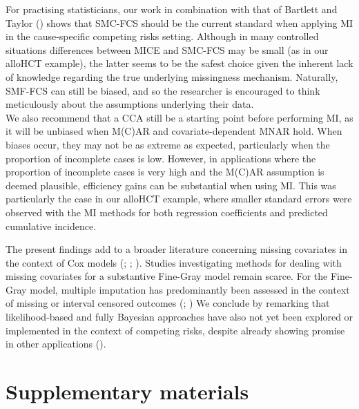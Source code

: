 \documentclass[
  letterpaper,
  DIV=11,
  numbers=noendperiod]{scrreprt}
\begin{document}
For practising statisticians, our work in combination with that of
Bartlett and Taylor
() shows that
SMC-FCS should be the current standard when applying MI in the
cause-specific competing risks setting. Although in many controlled
situations differences between MICE and SMC-FCS may be small (as in our
alloHCT example), the latter seems to be the safest choice given the
inherent lack of knowledge regarding the true underlying missingness
mechanism. Naturally, SMF-FCS can still be biased, and so the researcher
is encouraged to think meticulously about the assumptions underlying
their data.\\
We also recommend that a CCA still be a starting point before performing
MI, as it will be unbiased when M(C)AR and covariate-dependent MNAR
hold. When biases occur, they may not be as extreme as expected,
particularly when the proportion of incomplete cases is low. However, in
applications where the proportion of incomplete cases is very high and
the M(C)AR assumption is deemed plausible, efficiency gains can be
substantial when using MI. This was particularly the case in our alloHCT
example, where smaller standard errors were observed with the MI methods
for both regression coefficients and predicted cumulative incidence.

The present findings add to a broader literature concerning missing
covariates in the context of Cox models
(;
; ). Studies investigating methods for dealing with missing
covariates for a substantive Fine-Gray model remain scarce. For the
Fine-Gray model, multiple imputation has predominantly been assessed in
the context of missing or interval censored outcomes
(;
) We conclude by remarking that likelihood-based and fully Bayesian
approaches have also not yet been explored or implemented in the context
of competing risks, despite already showing promise in other
applications ().

\section*{Supplementary materials}\label{supplementary-materials-1}
\end{document}
